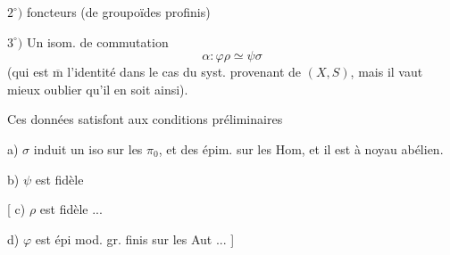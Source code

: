 $2^\circ)$   foncteurs
(de groupoïdes profinis)

$3^\circ)$ Un isom. de commutation
\[
\alpha:\varphi\rho\simeq\psi\sigma
\]
(qui est $\overline{\mathrm m}$ l'identité dans le cas du syst. provenant de $(X,S)$,
mais  il vaut mieux oublier qu'il en soit ainsi).

Ces données satisfont aux conditions 
préliminaires

a) $\sigma$ induit un iso sur les $\pi_0$, et des épim. sur les Hom,
et il est à noyau abélien.

b) $\psi$ est fidèle

[ c) $\rho$ est fidèle ...

d) $\varphi$ est épi mod. gr. finis sur les Aut ... ]

